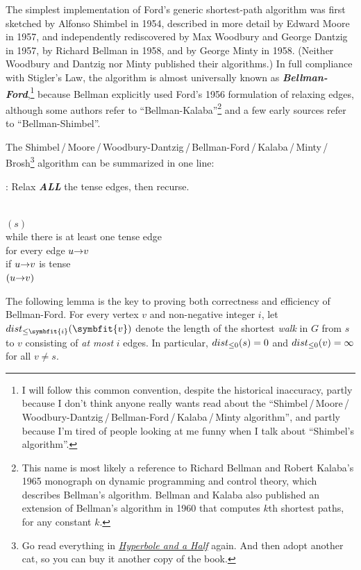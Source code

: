 The simplest implementation of Ford’s generic shortest-path algorithm was first sketched by Alfonso Shimbel in 1954, described in more detail by Edward Moore in 1957, and independently rediscovered by Max Woodbury and George Dantzig in 1957, by Richard Bellman in 1958, and by George Minty in 1958.
(Neither Woodbury and Dantzig nor Minty published their algorithms.)
In full compliance with Stigler’s Law, the algorithm is almost universally known as \textbf{\textit{Bellman-Ford}},\footnote{I will follow this common convention, despite the historical inaccuracy, partly because I don’t think anyone really wants read about the “Shimbel\,/\,Moore\,/\,Woodbury-Dantzig\,/\,Bellman-Ford\,/\,Kalaba\,/\,Minty algorithm”, and partly because I’m tired of people looking at me funny when I talk about “Shimbel’s algorithm”.} because Bellman explicitly used Ford’s 1956 formulation of relaxing edges, although some authors refer to “Bellman-Kalaba”\footnote{This name is most likely a reference to Richard Bellman and Robert Kalaba’s 1965 monograph on dynamic programming and control theory, which describes Bellman’s algorithm. Bellman and Kalaba also published an extension of Bellman’s algorithm in 1960 that computes $k$th shortest paths, for any constant $k$.} and a few early sources refer to “Bellman-Shimbel”.

The Shimbel\,/\,Moore\,/\,Woodbury-Dantzig\,/\,Bellman-Ford\,/\,Kalaba\,/\,Minty\,/\,Brosh\footnote{Go read everything in \href{http://hyperboleandahalf.blogspot.com/}{\textit{Hyperbole and a Half}} again. And then adopt another cat, so you can buy it another copy of the book.} algorithm can be summarized in one line:
\begin{problembox}
: Relax \textbf{\textit{ALL}} the tense edges, then recurse.
\end{problembox}

\begin{pseudocode}
\\
$(s)$\\
while there is at least one tense edge\\
\Indent for every edge $u\mathord{\rightarrow}v$\\
\Indent\Indent if $u\mathord{\rightarrow}v$ is tense\\
\Indent\Indent\Indent {}$(u\mathord{\rightarrow}v)$
\end{pseudocode}

The following lemma is the key to proving both correctness and efficiency of Bellman-Ford.
For every vertex $v$ and non-negative integer $i$, let \textbf{\textit{$\Var{dist}_{\le \symbfit{i}}(\symbfit{v})$}} denote the length of the shortest \textit{walk} in $G$ from $s$ to $v$ consisting of \textit{at most} $i$ edges.
In particular, $dist_{\le 0}(s) = 0$ and $dist_{\le 0}(v) = \infty$ for all $v \neq s$.

